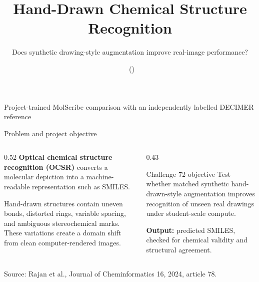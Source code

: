 \documentclass[aspectratio=169,10pt]{beamer}
\title{Hand-Drawn Chemical Structure Recognition}
\subtitle{Does synthetic drawing-style augmentation improve real-image performance?}
\author{\studentname\ (\rollnumber)}
\institute{\institution\\BT5230 Mini Project -- Challenge 72}
\date{}
\begin{document}
\begin{frame}[plain]
  \vspace{0.7cm}
  \titlepage
  \vfill
  \begin{center}
    \color{bluegray}\small
    Project-trained MolScribe comparison with an independently labelled DECIMER reference
  \end{center}
\end{frame}

\begin{frame}{Problem and project objective}
  \begin{columns}[T,onlytextwidth]
    \begin{column}{0.52\textwidth}
      \vspace{0.25cm}
      \textbf{Optical chemical structure recognition (OCSR)} converts a molecular depiction into a machine-readable representation such as SMILES.

      \vspace{0.45cm}
      Hand-drawn structures contain uneven bonds, distorted rings, variable spacing, and ambiguous stereochemical marks. These variations create a domain shift from clean computer-rendered images.
    \end{column}
    \begin{column}{0.43\textwidth}
      \begin{block}{Challenge 72 objective}
        Test whether matched synthetic hand-drawn-style augmentation improves recognition of unseen real drawings under student-scale compute.
      \end{block}
      \vspace{0.25cm}
      \textbf{Output:} predicted SMILES, checked for chemical validity and structural agreement.
    \end{column}
  \end{columns}
  \vfill
  {\tiny Source: Rajan et al., Journal of Cheminformatics 16, 2024, article 78.}
\end{frame}
\end{document}
